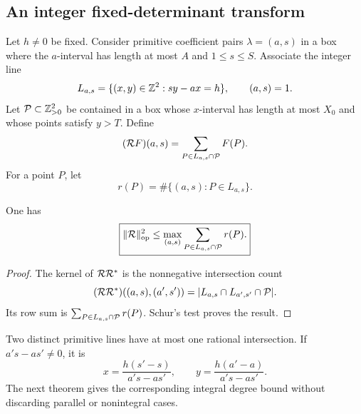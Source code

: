 \subsection{An integer fixed-determinant transform}

Let \(h\ne0\) be fixed.  Consider primitive coefficient pairs
\(
 \lambda=(a,s)
\)
in a box where the \(a\)-interval has length at most \(A\) and
\(1\le s\le S\).  Associate the integer line
\begin{equation}
 L_{a,s}=\{(x,y)\in\mathbb Z^2:sy-ax=h\},
 \qquad (a,s)=1.
 \label{eq:tpc35-integer-line}
\end{equation}
Let \(\mathcal P\subset\mathbb Z_{>0}^2\) be contained in a box whose \(x\)-interval
has length at most \(X_0\) and whose points satisfy \(y>T\).  Define
\begin{equation}
 (\mathcal R F)(a,s)=\sum_{P\in L_{a,s}\cap\mathcal P}F(P).
 \label{eq:tpc35-integer-Radon}
\end{equation}
For a point \(P\), let
\begin{equation}
 r(P)=\#\{(a,s):P\in L_{a,s}\}.
 \label{eq:tpc35-point-degree}
\end{equation}

\begin{lemma}
\label{lem:tpc35-line-Schur}
One has
\begin{equation}
 \boxed{
 \|\mathcal R\|_{\operatorname{op}}^2
 \le\max_{(a,s)}\sum_{P\in L_{a,s}\cap\mathcal P}r(P).}
 \label{eq:tpc35-line-Schur}
\end{equation}
\end{lemma}

\begin{proof}
The kernel of \(\mathcal R\mathcal R^*\) is the nonnegative intersection count
\[
 (\mathcal R\mathcal R^*)((a,s),(a',s'))
 =|L_{a,s}\cap L_{a',s'}\cap\mathcal P|.
\]
Its row sum is
\(
 \sum_{P\in L_{a,s}\cap\mathcal P}r(P)
\).  Schur's test proves the result.
\end{proof}

Two distinct primitive lines have at most one rational intersection.  If
\(a's-as'\ne0\), it is
\begin{equation}
 x=\frac{h(s'-s)}{a's-as'},
 \qquad
 y=\frac{h(a'-a)}{a's-as'}.
 \label{eq:tpc35-line-intersection}
\end{equation}
The next theorem gives the corresponding integral degree bound without
discarding parallel or nonintegral cases.

